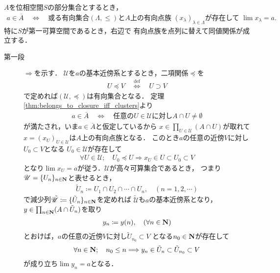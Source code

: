 	\begin{screen}
		\begin{thm}[閉集合は有向点族の極限点集合]
			$A$を位相空間$S$の部分集合とするとき，
			\begin{align}
				a \in \overline{A} \quad \Longleftrightarrow \quad
				\mbox{或る有向集合$(\Lambda,\leq)$と$A$上の有向点族
				$(x_\lambda)_{\lambda \in \Lambda}$が存在して
				$\lim x_\lambda = a$}.
			\end{align}
			特に$S$が第一可算空間であるとき，右辺で
			有向点族を点列に替えて同値関係が成立する．
		\end{thm}
	\end{screen}
	
	\begin{prf}\mbox{}
		\begin{description}
			\item[第一段] $\Longrightarrow$を示す．
				$\mathscr{U}$を$a$の基本近傍系とするとき，二項関係$\preceq$を
				\begin{align}
					U \preceq V \quad \overset{\mathrm{def}}{\Longleftrightarrow} \quad
					U \supset V
				\end{align}
				で定めれば$(\mathscr{U},\preceq)$は有向集合となる．
				定理\ref{thm:belongs_to_closure_iff_clusters}より
				\begin{align}
					a \in \overline{A} \quad \Longleftrightarrow \quad
					\mbox{任意の$U \in \mathscr{U}$に対し$A \cap U \neq \emptyset$}
				\end{align}
				が満たされ，いま$a \in \overline{A}$と仮定しているから
				$x \in \prod_{U \in \mathscr{U}} (A \cap U)$が取れて
				$x = (x_U)_{U \in \mathscr{U}}$は$A$上の有向点族となる．
				このとき$a$の任意の近傍$V$に対し$U_0 \subset V$となる
				$U_0 \in \mathscr{U}$が存在して
				\begin{align}
					\forall U \in \mathscr{U};\quad
					U_0 \preceq U \Longrightarrow x_U \in U \subset U_0 \subset V
				\end{align}
				となり$\lim x_U = a$が従う．$\mathscr{U}$が高々可算集合であるとき，
				つまり$\mathscr{U} = \{U_n\}_{n \in \mathbf{N}}$と表せるとき，
				\begin{align}
					\tilde{U}_n \coloneqq U_1 \cap U_2 \cap \cdots \cap U_n,
					\quad (n=1,2,\cdots) 
				\end{align}
				で減少列$\tilde{\mathscr{U}} \coloneqq \{\tilde{U}_n\}_{n \in \mathbf{N}}$を定めれば
				$\tilde{\mathscr{U}}$も$a$の基本近傍系となり，
				$y \in \prod_{n \in \mathbf{N}}(A \cap \tilde{U}_n)$を取り
				\begin{align}
					y_n \coloneqq y(n),\quad (\forall n \in \mathbf{N})
				\end{align}
				とおけば，$a$の任意の近傍$V$に対し$\tilde{U}_{n_0} \subset V$
				となる$n_0 \in \mathbf{N}$が存在して
				\begin{align}
					\forall n \in \mathbf{N};\quad
					n_0 \leq n \Longrightarrow y_n \in \tilde{U}_n \subset \tilde{U}_{n_0}
					\subset V
				\end{align}
				が成り立ち$\lim y_n = a$となる．
				

\end{description}
\end{prf}
